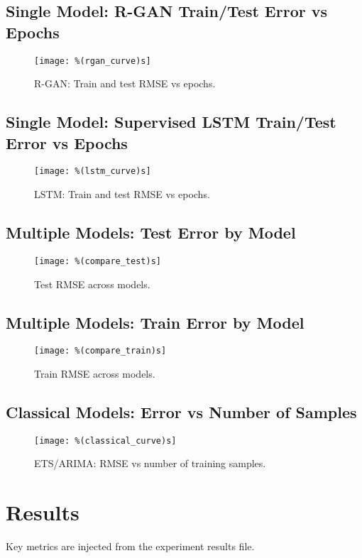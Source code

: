 \documentclass[11pt]{article}
\begin{document}
\subsection{Single Model: R-GAN Train/Test Error vs Epochs}
\begin{figure}[h]
\centering
\texttt{[image: \%(rgan\_curve)s]}
\caption{R-GAN: Train and test RMSE vs epochs.}
\end{figure}

\subsection{Single Model: Supervised LSTM Train/Test Error vs Epochs}
\begin{figure}[h]
\centering
\texttt{[image: \%(lstm\_curve)s]}
\caption{LSTM: Train and test RMSE vs epochs.}
\end{figure}

\subsection{Multiple Models: Test Error by Model}
\begin{figure}[h]
\centering
\texttt{[image: \%(compare\_test)s]}
\caption{Test RMSE across models.}
\end{figure}

\subsection{Multiple Models: Train Error by Model}
\begin{figure}[h]
\centering
\texttt{[image: \%(compare\_train)s]}
\caption{Train RMSE across models.}
\end{figure}

\subsection{Classical Models: Error vs Number of Samples}
\begin{figure}[h]
\centering
\texttt{[image: \%(classical\_curve)s]}
\caption{ETS/ARIMA: RMSE vs number of training samples.}
\end{figure}

\section{Results}
Key metrics are injected from the experiment results file.
\end{document}
